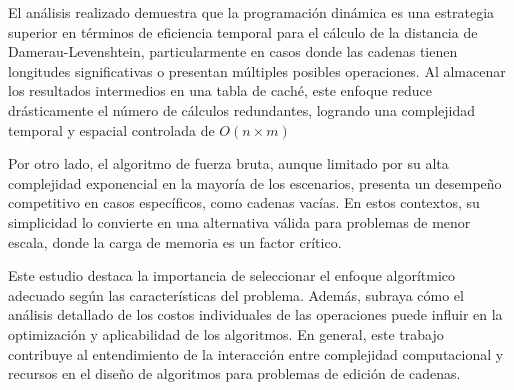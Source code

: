 El análisis realizado demuestra que la programación dinámica es una estrategia superior en términos de eficiencia temporal para el cálculo de la distancia de Damerau-Levenshtein, particularmente en casos donde las cadenas tienen longitudes significativas o presentan múltiples posibles operaciones. Al almacenar los resultados intermedios en una tabla de caché, este enfoque reduce drásticamente el número de cálculos redundantes, logrando una complejidad temporal y espacial controlada de $O(n \times m)$

Por otro lado, el algoritmo de fuerza bruta, aunque limitado por su alta complejidad exponencial en la mayoría de los escenarios, presenta un desempeño competitivo en casos específicos, como cadenas vacías. En estos contextos, su simplicidad lo convierte en una alternativa válida para problemas de menor escala, donde la carga de memoria es un factor crítico.

Este estudio destaca la importancia de seleccionar el enfoque algorítmico adecuado según las características del problema. Además, subraya cómo el análisis detallado de los costos individuales de las operaciones puede influir en la optimización y aplicabilidad de los algoritmos. En general, este trabajo contribuye al entendimiento de la interacción entre complejidad computacional y recursos en el diseño de algoritmos para problemas de edición de cadenas.
